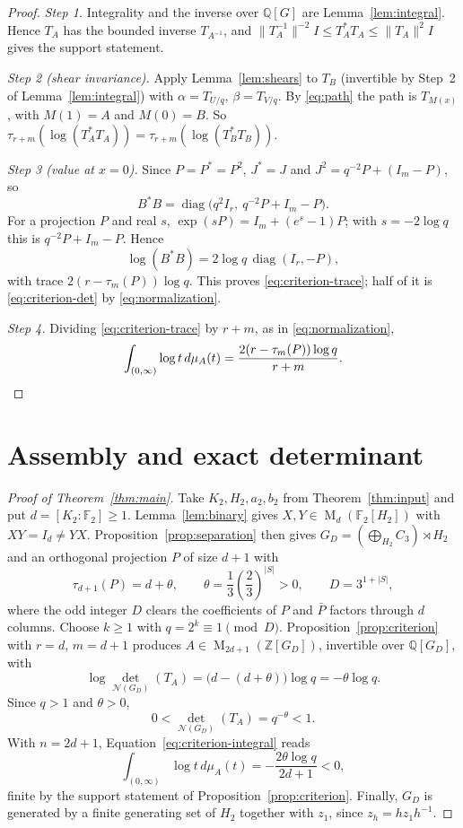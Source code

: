 \documentclass[11pt]{article}
\theoremstyle{remark}
\numberwithin{equation}{section}
\newcommand{\F}{\mathbb F}
\newcommand{\Z}{\mathbb Z}
\newcommand{\Q}{\mathbb Q}
\newcommand{\Mat}{\operatorname{M}}
\newcommand{\diag}{\operatorname{diag}}
\newcommand{\N}{\mathcal N}
\begin{document}
\begin{proof}
\emph{Step 1.} Integrality and the inverse over $\Q[G]$ are Lemma~\ref{lem:integral}. Hence $T_A$ has the bounded inverse $T_{A^{-1}}$, and $\|T_A^{-1}\|^{-2}I\le T_A^*T_A\le\|T_A\|^2I$ gives the support statement.

\emph{Step 2 (shear invariance).} Apply Lemma~\ref{lem:shears} to $T_B$ (invertible by Step~2 of Lemma~\ref{lem:integral}) with $\alpha=T_{U/q}$, $\beta=T_{V/q}$. By \eqref{eq:path} the path is $T_{M(x)}$, with $M(1)=A$ and $M(0)=B$. So $\tau_{r+m}(\log(T_A^*T_A))=\tau_{r+m}(\log(T_B^*T_B))$.

\emph{Step 3 (value at $x=0$).} Since $P=P^*=P^2$, $J^*=J$ and $J^2=q^{-2}P+(I_m-P)$, so
\[
 B^*B=\diag\bigl(q^2I_r,\ q^{-2}P+I_m-P\bigr).
\]
For a projection $P$ and real $s$, $\exp(sP)=I_m+(e^s-1)P$; with $s=-2\log q$ this is $q^{-2}P+I_m-P$. Hence
\[
 \log(B^*B)=2\log q\,\diag(I_r,-P),
\]
with trace $2(r-\tau_m(P))\log q$. This proves \eqref{eq:criterion-trace}; half of it is \eqref{eq:criterion-det} by \eqref{eq:normalization}.

\emph{Step 4.} Dividing \eqref{eq:criterion-trace} by $r+m$, as in \eqref{eq:normalization},
\begin{equation}\label{eq:criterion-integral}
 \int_{(0,\infty)}\log t\,d\mu_A(t)=\frac{2(r-\tau_m(P))\log q}{r+m}.\qedhere
\end{equation}
\end{proof}

\section{Assembly and exact determinant}
\label{sec:assembly}

\begin{proof}[Proof of Theorem~\ref{thm:main}]
Take $K_2,H_2,a_2,b_2$ from Theorem~\ref{thm:input} and put $d=[K_2:\F_2]\ge1$. Lemma~\ref{lem:binary} gives $X,Y\in\Mat_d(\F_2[H_2])$ with $XY=I_d\ne YX$. Proposition~\ref{prop:separation} then gives $G_D=(\bigoplus_{H_2}C_3)\rtimes H_2$ and an orthogonal projection $P$ of size $d+1$ with
\[
 \tau_{d+1}(P)=d+\theta,\qquad\theta=\frac13\left(\frac23\right)^{|S|}>0,\qquad D=3^{1+|S|},
\]
where the odd integer $D$ clears the coefficients of $P$ and $\bar P$ factors through $d$ columns. Choose $k\ge1$ with $q=2^k\equiv1\pmod D$. Proposition~\ref{prop:criterion} with $r=d$, $m=d+1$ produces $A\in\Mat_{2d+1}(\Z[G_D])$, invertible over $\Q[G_D]$, with
\[
 \log\det_{\N(G_D)}(T_A)=\bigl(d-(d+\theta)\bigr)\log q=-\theta\log q.
\]
Since $q>1$ and $\theta>0$,
\begin{equation}\label{eq:final-det}
 0<\det_{\N(G_D)}(T_A)=q^{-\theta}<1.
\end{equation}
With $n=2d+1$, Equation~\eqref{eq:criterion-integral} reads
\begin{equation}\label{eq:final-integral}
 \int_{(0,\infty)}\log t\,d\mu_A(t)=-\frac{2\theta\log q}{2d+1}<0,
\end{equation}
finite by the support statement of Proposition~\ref{prop:criterion}. Finally, $G_D$ is generated by a finite generating set of $H_2$ together with $z_1$, since $z_h=hz_1h^{-1}$.
\end{proof}
\end{document}
